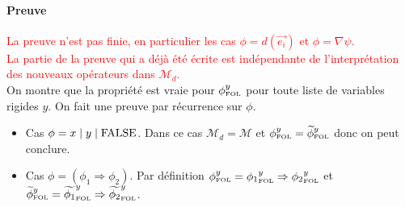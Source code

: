 \documentclass[12pt]{article}
\newcommand{\FOL}{\ensuremath{\textup{\tiny{}FOL}}}
\newcommand{\M}{\ensuremath{\mathcal{M}}}
\newcommand{\raph}[1]{\textcolor{red}{#1}}
\begin{document}
\paragraph{Preuve}
\raph{La preuve n'est pas finie, en particulier les cas $\phi = d(\vec{e_i})$ et $\phi = \nabla \psi$.}\\
\raph{La partie de la preuve qui a déjà été écrite est indépendante de l'interprétation des nouveaux opérateurs dans $\M_d$.}\\
On montre que la propriété est vraie pour $\phi_\FOL^y$ pour toute liste de variables rigides $y$.
On fait une preuve par récurrence sur $\phi$.
\begin{itemize}
\item
  Cas $\phi = x \; | \; y \; | \; \textup{FALSE}$.
  Dans ce cas $\M_d = \M$ et $\phi_\FOL^y = \widetilde{\phi}_\FOL^y$ donc on peut conclure.
\item
  Cas $\phi = (\phi_1 \Rightarrow \phi_2)$.
  Par définition ${\phi}_\FOL^y = {\phi_1}_\FOL^y \Rightarrow {\phi_2}_\FOL^y$ et  $\widetilde{\phi}_\FOL^y = \widetilde{\phi_1}_\FOL^y \Rightarrow \widetilde{\phi_2}_\FOL^y$.




\end{itemize}
\end{document}
